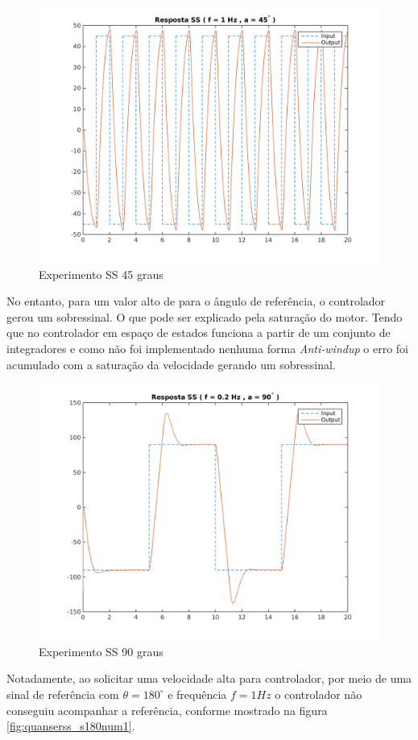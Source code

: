 \documentclass[a4paper,11pt]{article}
\begin{document}
\begin{figure}[H]
    \centering
    \includegraphics[width=0.8\linewidth]{tex/img/quanserss_s45num1.png}
    \caption{Experimento SS 45 graus}
    \label{fig:quanserss_s45num1}
\end{figure}


No entanto, para um valor alto de para o ângulo de referência, o controlador gerou um sobressinal. O que pode ser explicado pela saturação do motor. Tendo que no controlador em espaço de estados funciona a partir de um conjunto de integradores e como não foi implementado nenhuma forma \textit{Anti-windup} o erro foi acumulado com a saturação da velocidade gerando um sobressinal.

\begin{figure}[H]
    \centering
    \includegraphics[width=0.8\linewidth]{tex/img/quanserss_s90num5.png}
    \caption{Experimento SS 90 graus}
    \label{fig:quanserss_s90num5}
\end{figure}

Notadamente, ao solicitar uma velocidade alta para controlador, por meio de uma sinal de referência com $\theta = 180^\circ$ e frequência $f = 1Hz$ o controlador não conseguiu acompanhar a referência, conforme mostrado na figura \ref{fig:quanserss_s180num1}.
\end{document}
